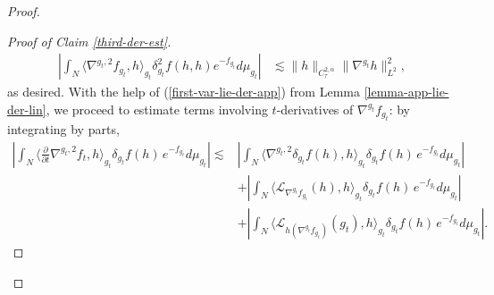 \documentclass[a4paper,11pt,reqno]{amsart}
\numberwithin{equation}{section}
\begin{document}
\begin{proof}
\begin{proof}[Proof of Claim \ref{third-der-est}]
			\begin{equation*}
			\begin{split}
			\left|\int_N\langle\nabla^{g_t,2}f_{g_t},h\rangle_{g_t}\delta_{g_t}^2f(h,h)e^{-f_{g_t}}d\mu_{g_t}\right|&\lesssim\|h\|_{C^{2,\alpha}_{\tau}}\|\nabla^{g_t}h\|_{L^2}^2,
			\end{split}
			\end{equation*}
			as desired.
			With the help of (\ref{first-var-lie-der-app}) from Lemma \ref{lemma-app-lie-der-lin}, we proceed to estimate terms involving $t$-derivatives of $\nabla^{g_t}f_{g_t}$: by integrating by parts,
			\begin{equation}
			\begin{split}\label{huge-est-covid}
			\left|\int_N\langle\frac{\partial}{\partial t}\nabla^{g_t,2}f_t,h\rangle_{g_t}\delta_{g_t}f(h)\,e^{-f_{g_t}}d\mu_{g_t}\right|\lesssim& \left|\int_N\langle\nabla^{g_t,2}\delta_{g_t}f(h),h\rangle_{g_t}\delta_{g_t}f(h)\,e^{-f_{g_t}}d\mu_{g_t}\right|\\
			& +\left|\int_N\langle\mathcal{L}_{\nabla^{g_t}f_{g_t}}(h),h\rangle_{g_t}\delta_{g_t}f(h)\,e^{-f_{g_t}}d\mu_{g_t}\right|\\
			& +\left|\int_N\langle\mathcal{L}_{h(\nabla^{g_t}f_{g_t})}(g_t),h\rangle_{g_t}\delta_{g_t}f(h)\,e^{-f_{g_t}}d\mu_{g_t}\right|.
			\end{split}
			\end{equation}
			

\end{proof}
\end{proof}
\end{document}

